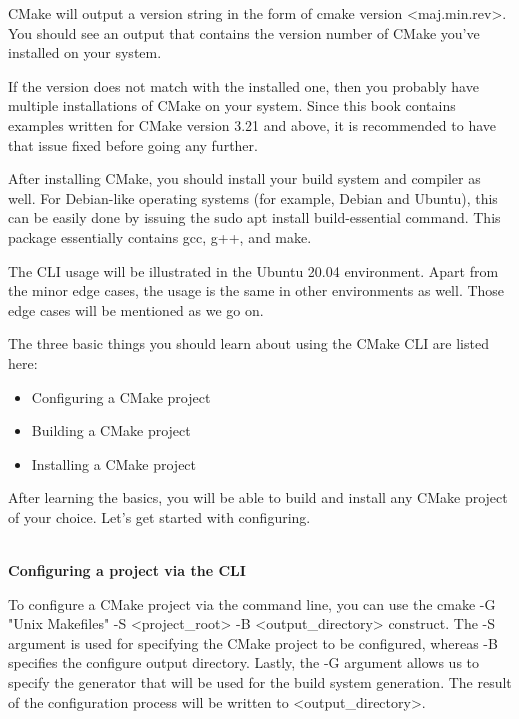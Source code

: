 CMake will output a version string in the form of cmake version <maj.min.rev>. You should see an output that contains the version number of CMake you've installed on your system.

\begin{tcolorbox}[colback=webgreen!5!white,colframe=webgreen!75!black,title=Note]
If the version does not match with the installed one, then you probably have multiple installations of CMake on your system. Since this book contains examples written for CMake version 3.21 and above, it is recommended to have that issue fixed before going any further.
\end{tcolorbox}

After installing CMake, you should install your build system and compiler as well. For Debian-like operating systems (for example, Debian and Ubuntu), this can be easily done by issuing the sudo apt install build-essential command. This package essentially contains gcc, g++, and make.

The CLI usage will be illustrated in the Ubuntu 20.04 environment. Apart from the minor edge cases, the usage is the same in other environments as well. Those edge cases will be mentioned as we go on.


The three basic things you should learn about using the CMake CLI are listed here:

\begin{itemize}
\item 
Configuring a CMake project

\item 
Building a CMake project

\item 
Installing a CMake project
\end{itemize}

After learning the basics, you will be able to build and install any CMake project of your choice. Let's get started with configuring.

\hspace*{\fill} \\ %
\noindent
\textbf{Configuring a project via the CLI}

To configure a CMake project via the command line, you can use the cmake -G "Unix Makefiles" -S <project\_root> -B <output\_directory> construct. The -S argument is used for specifying the CMake project to be configured, whereas -B specifies the configure output directory. Lastly, the -G argument allows us to specify the generator that will be used for the build system generation. The result of the configuration process will be written to <output\_directory>.

